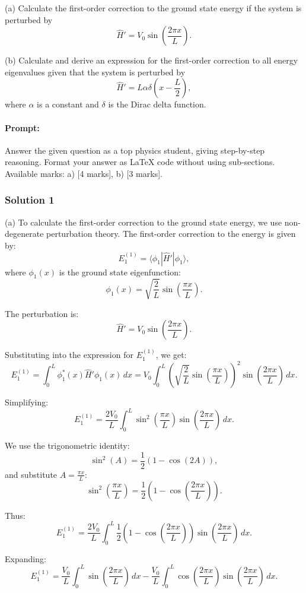 \documentclass{article}
\begin{document}
(a) Calculate the first-order correction to the ground state energy if the system is perturbed by
\[
\hat{H}' = V_0 \sin\left(\frac{2\pi x}{L}\right).
\]

(b) Calculate and derive an expression for the first-order correction to all energy eigenvalues given that the system is perturbed by
\[
\hat{H}' = L \alpha \delta\left(x - \frac{L}{2}\right),
\]
where \(\alpha\) is a constant and \(\delta\) is the Dirac delta function.

\paragraph{Prompt: \\} 
Answer the given question as a top physics student, giving step-by-step reasoning. Format your answer as LaTeX code without using sub-sections. Available marks: a) [4 marks], b) [3 marks].


\subsubsection{Solution 1}
(a) To calculate the first-order correction to the ground state energy, we use non-degenerate perturbation theory. The first-order correction to the energy is given by:
\[
E_1^{(1)} = \langle \phi_1 | \hat{H}' | \phi_1 \rangle,
\]
where \(\phi_1(x)\) is the ground state eigenfunction:
\[
\phi_1(x) = \sqrt{\frac{2}{L}} \sin\left(\frac{\pi x}{L}\right).
\]

The perturbation is:
\[
\hat{H}' = V_0 \sin\left(\frac{2\pi x}{L}\right).
\]

Substituting into the expression for \(E_1^{(1)}\), we get:
\[
E_1^{(1)} = \int_0^L \phi_1^*(x) \hat{H}' \phi_1(x) \, dx = V_0 \int_0^L \left(\sqrt{\frac{2}{L}} \sin\left(\frac{\pi x}{L}\right)\right)^2 \sin\left(\frac{2\pi x}{L}\right) \, dx.
\]

Simplifying:
\[
E_1^{(1)} = \frac{2V_0}{L} \int_0^L \sin^2\left(\frac{\pi x}{L}\right) \sin\left(\frac{2\pi x}{L}\right) \, dx.
\]

We use the trigonometric identity:
\[
\sin^2(A) = \frac{1}{2} \left(1 - \cos(2A)\right),
\]
and substitute \(A = \frac{\pi x}{L}\):
\[
\sin^2\left(\frac{\pi x}{L}\right) = \frac{1}{2} \left(1 - \cos\left(\frac{2\pi x}{L}\right)\right).
\]

Thus:
\[
E_1^{(1)} = \frac{2V_0}{L} \int_0^L \frac{1}{2} \left(1 - \cos\left(\frac{2\pi x}{L}\right)\right) \sin\left(\frac{2\pi x}{L}\right) \, dx.
\]

Expanding:
\[
E_1^{(1)} = \frac{V_0}{L} \int_0^L \sin\left(\frac{2\pi x}{L}\right) \, dx - \frac{V_0}{L} \int_0^L \cos\left(\frac{2\pi x}{L}\right) \sin\left(\frac{2\pi x}{L}\right) \, dx.
\]
\end{document}
